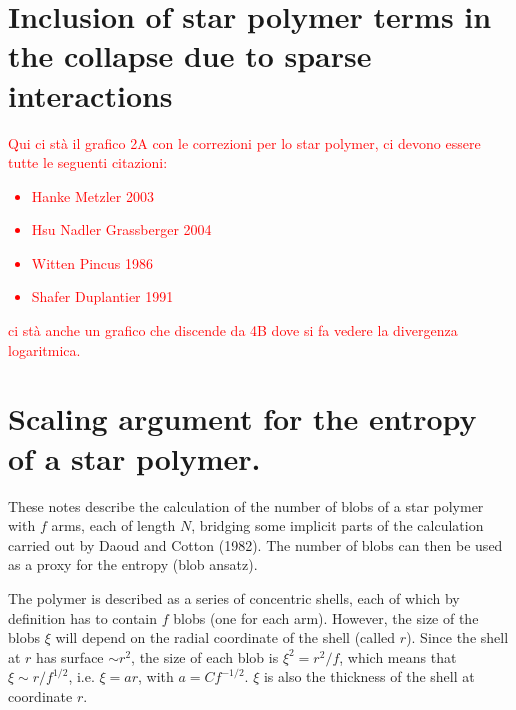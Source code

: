 \documentclass[
preprint,
a4paper,
12pt,
superscriptaddress,
pre]{revtex4}
\newcommand{\rev}[1]{\textcolor{red}{#1}}
\begin{document}




  


%

\section{Inclusion of star polymer terms in the collapse due to sparse
interactions}
\rev{
Qui ci st\`a il grafico 2A con le correzioni per lo star polymer, ci
devono essere tutte le seguenti citazioni:
\begin{itemize}
\item
  Hanke Metzler 2003
\item
  Hsu Nadler Grassberger 2004
\item
  Witten Pincus 1986
\item
  Shafer Duplantier 1991
\end{itemize}
ci st\`a anche un grafico che discende da 4B dove si fa vedere la
divergenza logaritmica.
}
\section{Scaling argument for the entropy of a star polymer.}

These notes describe the calculation of the number of blobs of a star
polymer with $f$ arms, each of length $N$, bridging some implicit
parts of the calculation carried out by Daoud and Cotton (1982). The
number of blobs can then be used as a proxy for the entropy (blob
ansatz).

The polymer is described as a series of concentric shells, each of
which by definition has to contain $f$ blobs (one for each
arm). However, the size of the blobs $\xi$ will depend on the radial
coordinate of the shell (called $r$). Since the shell at $r$ has
surface $\sim r^2$, the size of each blob is $\xi^2 = r^2/f$, which
means that $\xi \sim r / f^{1/2}$, i.e. $\xi = a r$, with $a = C
f^{-1/2} $.  $\xi$ is also the thickness of the shell at coordinate
$r$.
\end{document}

